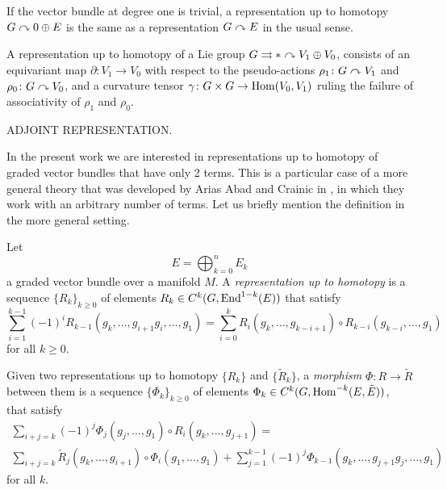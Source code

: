 \begin{example}
If the vector bundle at degree one is trivial, a representation up to homotopy  $G\curvearrowright 0\oplus E$ is the same as a representation $G\curvearrowright E$ in the usual sense.
\end{example}

\begin{example}
A representation up to homotopy of a Lie group $G\rightrightarrows *\curvearrowright V_1\oplus V_0$, consists of an equivariant map $\partial\colon V_1\to V_0$ with respect to the pseudo-actions $\rho_1\colon G\curvearrowright V_1$ and $\rho_0\colon G\curvearrowright V_0$, and a curvature tensor $\gamma\colon G\times G\to \operatorname{Hom}(V_0, V_1)$ ruling the failure of associativity of $\rho_1$ and $\rho_0$.
\end{example}

\begin{example}
ADJOINT REPRESENTATION.
\end{example}

In the present work we are interested in representations up to homotopy of graded vector bundles that have only 2 terms.
This is a particular case of a more general theory that was developed by Arias Abad and Crainic in \cite{aac13}, in which they work with an arbitrary number of terms.
Let us briefly mention the definition in the more general setting.

Let
\[ E=\bigoplus_{k=0}^n E_k \]
a graded vector bundle over a manifold $M$.
A \emph{representation up to homotopy} is a sequence $\{R_k\}_{k\geq 0}$ of elements $R_k\in C^k(G,\operatorname{End}^{1-k}(E))$ that satisfy
\[ \sum_{i=1}^{k-1} (-1)^i R_{k-1}(g_k,\dots,g_{i+1}g_i,\dots,g_1) = \sum_{i=0}^k R_i(g_k,\dots,g_{k-i+1})\circ R_{k-i}(g_{k-i},\dots,g_1) \]
for all $k\geq 0$.

Given two representations up to homotopy $\{R_k\}$ and $\{\tilde R_k\}$, a \emph{morphism} $\Phi\colon R\to\tilde R$ between them is a sequence $\{\Phi_k\}_{k\geq 0}$ of elements $\Phi_k\in C^k(G,\operatorname{Hom}^{-k}(E,\tilde E))$, that satisfy
\begin{multline}
\sum_{i+j=k} (-1)^j \Phi_j(g_j,\dots,g_1) \circ R_i(g_k,\dots, g_{j+1}) = \\
\sum_{i+j=k} \tilde R_j(g_k,\dots,g_{i+1}) \circ \Phi_i(g_1,\dots,g_1) + \sum_{j=1}^{k-1} (-1)^j \Phi_{k-1}(g_k,\dots,g_{j+1}g_j,\dots,g_1)
\end{multline}
for all $k$.
